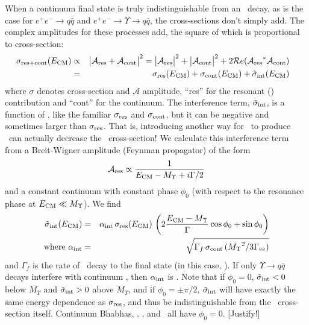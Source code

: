 \documentclass{cornell}
\begin{document}
When a continuum final state is truly indistinguishable from an \ups\
decay, as is the case for $e^+e^- \to q\bar{q}$ and $e^+e^- \to
\Upsilon \to q\bar{q}$, the cross-sections don't simply add.  The
complex amplitudes for these processes add, the square of which is
proportional to cross-section: \label{sec:earlyinterference}
%
\newcommand{\res}{{\mbox{\scriptsize res}}}
\newcommand{\cont}{{\mbox{\scriptsize cont}}}
\newcommand{\inter}{{\mbox{\scriptsize int}}}
\newcommand{\aye}{{\mathcal A}}
\begin{eqnarray}
  \hspace{-0.3 cm} \sigma_{\res+\cont}(E_\subs{CM}) &\propto& \big| \aye_\res + \aye_\cont \big|^2 =
  \big| \aye_\res \big|^2 + \big| \aye_\cont \big|^2 + 2 {\mathcal Re}({\aye_\res}^* \aye_\cont) \\
  &=& \sigma_\res(E_\subs{CM}) + \sigma_\cont(E_\subs{CM}) + \tilde{\sigma}_\inter(E_\subs{CM})
  \label{eqn:rescontinter}
\end{eqnarray}
where $\sigma$ denotes cross-section and $\aye$ amplitude, ``res'' for
the resonant (\ups) contribution and ``cont'' for the continuum.  The
interference term, $\tilde{\sigma}_\inter$, is a function of \ecm, like the
familiar $\sigma_\res$ and $\sigma_\cont$, but it can be negative and
sometimes larger than $\sigma_\res$.  That is, introducing another way
for \ee\ to produce \qqbar\ can actually decrease the \qqbar\
cross-section!  We calculate this interference term from a
Breit-Wigner amplitude (Feynman propagator) of the form
\begin{equation}
  \aye_\res \propto \frac{1}{E_\subs{CM} - M_\Upsilon + i\Gamma/2}
\end{equation}
and a constant continuum with constant phase $\phi_0$ (with respect to
the resonance phase at $E_{\mbox{\scriptsize CM}} \ll M_\Upsilon$).  We find
\begin{eqnarray}
  \tilde{\sigma}_\inter(E_\subs{CM}) &=& \alpha_\subs{int} \, \sigma_\subs{res}(E_\subs{CM}) \,
  \left(2 \frac{E_\subs{CM} - M_\Upsilon}{\Gamma} \cos \phi_0 + \sin
  \phi_0 \right) \\
  \mbox{where } \alpha_\subs{int} &=& \sqrt{\Gamma_f \, \sigma_\cont \, ({M_\Upsilon}^2 / 3 \Gamma_{ee})}
  \label{eqn:yint}
\end{eqnarray}
and $\Gamma_f$ is the rate of \ups\ decay to the final state (in this
case, \qqbar).  If only $\Upsilon \to q\bar{q}$ decays interfere with
continuum \qqbar, then $\alpha_{\mbox{\scriptsize int}}$ is \bork.  Note that if $\phi_0
= 0$, $\tilde{\sigma}_\inter < 0$ below $M_\Upsilon$ and $\tilde{\sigma}_\inter > 0$
above $M_\Upsilon$, and if $\phi_0 = \pm\pi/2$, $\tilde{\sigma}_\inter$ will have
exactly the same energy dependence as $\sigma_\res$, and thus be
indistinguishable from the \ups\ cross-section itself.  Continuum
Bhabhas, \mumu, \tautau, and \qqbar\ all have $\phi_0 = 0$.  [Justify!]
\end{document}
